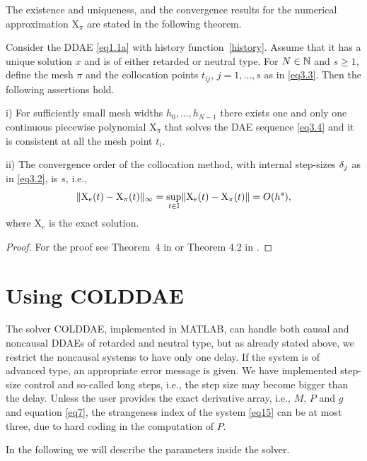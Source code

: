 \documentclass[final,reqno]{siamltex}
\begin{document}
The existence and uniqueness, and the convergence results for the numerical approximation $\mathrm{X}_{\pi}$ are stated in the following theorem.
%
\begin{theorem}\label{Thm6.1}
Consider the DDAE \eqref{eq1.1a} with history function~\ref{history}. Assume that it has a unique solution $x$ and is of either retarded or neutral type.
For $N \in \mathbb{N}$ and $s \geq 1$, define the mesh $\pi$ and the collocation points $t_{ij}$, $j=1,\dots,s$ as in \eqref{eq3.3}.
Then the following assertions hold.
\begin{compactenum}
 \item[i)] For sufficiently small mesh widths $h_0,\dots,h_{N-1}$ there exists one and only one continuous piecewise polynomial $\mathrm{X}_{\pi}$ that solves
 the DAE sequence \eqref{eq3.4} and it is consistent at all the mesh point $t_i$.
 \item[ii)] The convergence order of the collocation method, with internal step-sizes  $\delta_j$ as in \eqref{eq3.2}, is $s$, i.e.,
 \[
  \| \mathrm{X}_e(t) - \mathrm{X}_{\pi}(t) \|_{\infty} = \underset{t \in \mathbb{I}}{\sup} \| \mathrm{X}_e(t) - \mathrm{X}_{\pi}(t) \| = O(h^s),
 \]
%
 where $\mathrm{X}_e$ is the exact solution.
\end{compactenum}
\end{theorem}
\begin{proof}
For the proof see Theorem~4 in \cite{Hau97} or Theorem 4.2 in \cite{GugH07}.
\end{proof}
%

\section{Using COLDDAE}

The solver COLDDAE, implemented in MATLAB, can handle both causal and noncausal DDAEs of retarded and neutral type, but as already stated above, we restrict the noncausal systems to have only one delay. If the system is of advanced type, an appropriate error message is given.
We have implemented step-size control and so-called long steps, i.e.,  the step size may become bigger than the delay.
Unless the user provides the exact derivative array, i.e., $M$, $P$ and $g$ and equation \eqref{eq7}, the strangeness index of the system \eqref{eq15} can be at most three, due to hard coding in the computation of $P$.

In the following we will describe the parameters inside the solver.
\end{document}
